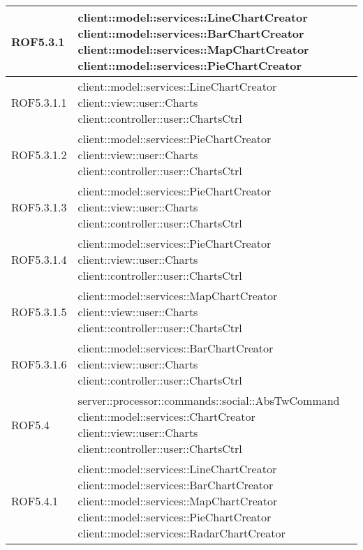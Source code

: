 \begin{center}
\begin{longtable}{| p{2.5cm} | p{11cm} |}
\hline
ROF5.3.1 & client::model::services::LineChartCreator \newline client::model::services::BarChartCreator \newline client::model::services::MapChartCreator \newline client::model::services::PieChartCreator \\
\hline
ROF5.3.1.1 & client::model::services::LineChartCreator \newline client::view::user::Charts \newline client::controller::user::ChartsCtrl \\
\hline
ROF5.3.1.2 & client::model::services::PieChartCreator \newline client::view::user::Charts \newline client::controller::user::ChartsCtrl \\
\hline
ROF5.3.1.3 & client::model::services::PieChartCreator \newline client::view::user::Charts \newline client::controller::user::ChartsCtrl \\
\hline
ROF5.3.1.4 & client::model::services::PieChartCreator \newline client::view::user::Charts \newline client::controller::user::ChartsCtrl \\
\hline
ROF5.3.1.5 & client::model::services::MapChartCreator \newline client::view::user::Charts \newline client::controller::user::ChartsCtrl \\
\hline
ROF5.3.1.6 & client::model::services::BarChartCreator \newline client::view::user::Charts \newline client::controller::user::ChartsCtrl \\
\hline
ROF5.4 & server::processor::commands::social::AbsTwCommand \newline client::model::services::ChartCreator \newline client::view::user::Charts \newline client::controller::user::ChartsCtrl \\
\hline
ROF5.4.1 & client::model::services::LineChartCreator \newline client::model::services::BarChartCreator \newline client::model::services::MapChartCreator \newline client::model::services::PieChartCreator \newline client::model::services::RadarChartCreator \\

\end{longtable}
\end{center}
